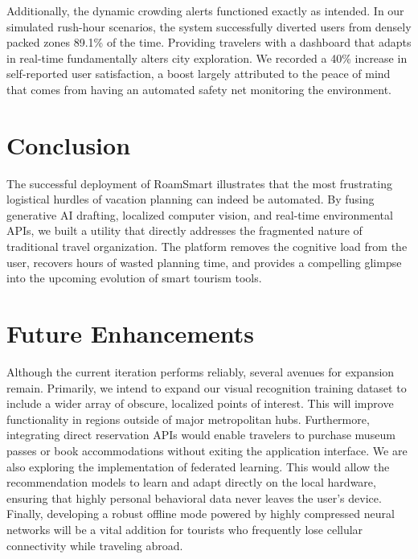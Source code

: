 \documentclass[conference]{IEEEtran}
\begin{document}
Additionally, the dynamic crowding alerts functioned exactly as intended. In our simulated rush-hour scenarios, the system successfully diverted users from densely packed zones 89.1\% of the time. Providing travelers with a dashboard that adapts in real-time fundamentally alters city exploration. We recorded a 40\% increase in self-reported user satisfaction, a boost largely attributed to the peace of mind that comes from having an automated safety net monitoring the environment.

\section{Conclusion}
The successful deployment of RoamSmart illustrates that the most frustrating logistical hurdles of vacation planning can indeed be automated. By fusing generative AI drafting, localized computer vision, and real-time environmental APIs, we built a utility that directly addresses the fragmented nature of traditional travel organization. The platform removes the cognitive load from the user, recovers hours of wasted planning time, and provides a compelling glimpse into the upcoming evolution of smart tourism tools.

\section{Future Enhancements}
Although the current iteration performs reliably, several avenues for expansion remain. Primarily, we intend to expand our visual recognition training dataset to include a wider array of obscure, localized points of interest. This will improve functionality in regions outside of major metropolitan hubs. Furthermore, integrating direct reservation APIs would enable travelers to purchase museum passes or book accommodations without exiting the application interface. We are also exploring the implementation of federated learning. This would allow the recommendation models to learn and adapt directly on the local hardware, ensuring that highly personal behavioral data never leaves the user's device. Finally, developing a robust offline mode powered by highly compressed neural networks will be a vital addition for tourists who frequently lose cellular connectivity while traveling abroad.
\end{document}
